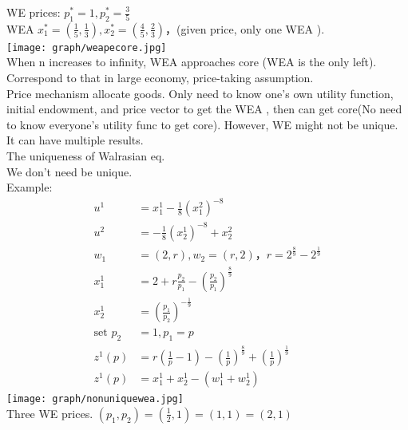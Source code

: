 \documentclass[letterpaper,13pt,single,pdftex]{scrartcl}
\begin{document}
WE prices: $p_1^* = 1, p_2^* = \frac{3}{5}$\\
WEA $x_1^* = (\frac{1}{5}, \frac{1}{3}), x_2^* = (\frac{4}{5}, \frac{2}{3})$，(given price, only one WEA ).\\
\texttt{[image: graph/weapecore.jpg]}\\
When n increases to infinity, WEA approaches core (WEA is the only left). Correspond to that in large economy, price-taking assumption. \\
Price mechanism allocate goods. Only need to know one's own utility function, initial endowment, and price vector to get the WEA , then can get core(No need to know everyone's utility func to get core). 
However, WE might not be unique. It can have multiple results. \\

The uniqueness of Walrasian eq. \\
We don't need be unique. \\
Example: 
\begin{align*}
    u^1 &= x_1^1 -\frac{1}{8}(x_1^2)^{-8}\\ 
    u^2 &= -\frac{1}{8}(x_2^1)^{-8} + x_2^2\\
    w_1 &= (2,r) , w_2 = (r,2)， r= 2^{\frac{8}{9}}  - 2^{\frac{1}{9}}\\
    x_1^1 &= 2 + r \frac{p_2}{p_1} -(\frac{p_2}{p_1})^\frac{8}{9}\\
    x_2^1 &= (\frac{p_1}{p_2})^{-\frac{1}{9}}\\
    \text{set } p_2 &=1, p_1 = p\\
    z^1(p) &= r(\frac{1}{p} - 1) - (\frac{1}{p})^{\frac{8}{9}} +(\frac{1}{p})^{\frac{1}{9}}\\
    z^1(p) &= x_1^1 +x_2^1 -(w_1^1 +w_2^1)
\end{align*}
\texttt{[image: graph/nonuniquewea.jpg]} \\
Three WE prices. $(p_1, p_2) = (\frac{1}{2},1) = (1,1)= (2,1)$\\
\end{document}
